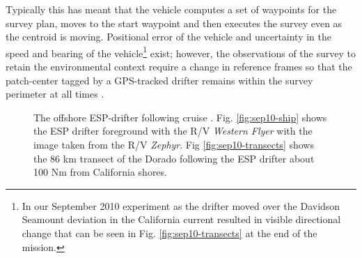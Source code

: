 Typically this has meant that the vehicle computes a set of waypoints
for the survey plan, moves to the start waypoint and then executes the
survey even as the centroid is moving. Positional error of the vehicle
and uncertainty in the speed and bearing of the vehicle\footnote{In
  our September 2010 experiment as the drifter moved over the Davidson
  Seamount \cite{clague10} deviation in the California current
  resulted in visible directional change that can be seen in
  Fig. \ref{fig:sep10-transects} at the end of the mission.} exist;
however, the observations of the survey to retain the environmental
context require a change in reference frames so that the patch-center
tagged by a GPS-tracked drifter remains within the survey perimeter at
all times \cite{das11b}.

\begin{figure}
\centering
{}
  \caption{\small{The offshore \can ESP-drifter following cruise
      \cite{das11b}. Fig. \ref{fig:sep10-ship} shows the ESP drifter
      foreground with the R/V \emph{Western Flyer} with the image
      taken from the R/V \emph{Zephyr}. Fig \ref{fig:sep10-transects}
      shows the 86 km transect of the Dorado following the ESP drifter
      about 100 Nm from California shores.}}
\label{fig:gulper}
\end{figure}

